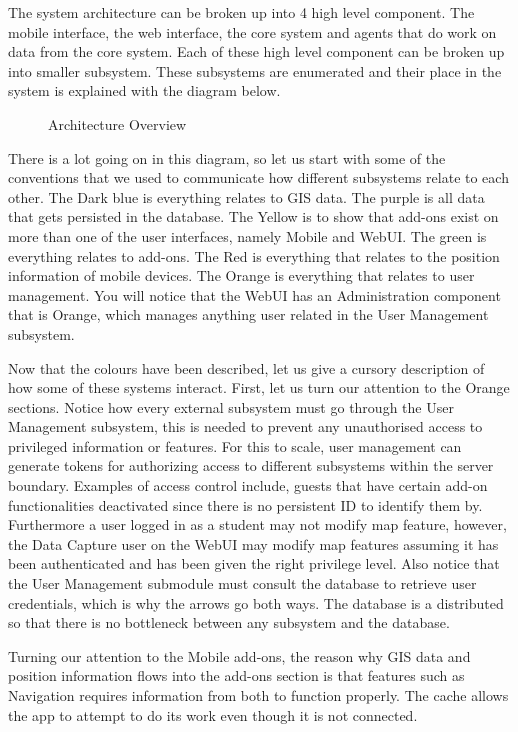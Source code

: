 The system architecture can be broken up into 4 high level component. The mobile interface, the web interface, the core system and agents that do work on data from the core system. Each of these high level component can be broken up into smaller subsystem. These subsystems are enumerated and their place in the system is explained with the diagram below.

\begin{figure}[h]
\caption{Architecture Overview}
\end{figure}
There is a lot going on in this diagram, so let us start with some of the conventions that we used to communicate how different subsystems relate to each other. The Dark blue is everything relates to GIS data. The purple is all data that gets persisted in the database. The Yellow is to show that add-ons exist on more than one of the user interfaces, namely Mobile and WebUI. The green is everything relates to add-ons. The Red is everything that relates to the position information of mobile devices. The Orange is everything that relates to user management. You will notice that the WebUI has an Administration component that is Orange, which manages anything user related in the User Management subsystem.\par
\bigskip
\noindent
Now that the colours have been described, let us give a cursory description of how some of these systems interact. First, let us  turn our attention to the Orange sections. Notice how every external subsystem must go through the User Management subsystem, this is needed to prevent any unauthorised access to privileged information or features. For this to scale, user management can generate tokens for authorizing access to different subsystems within the server boundary. Examples of access control include, guests that have certain add-on functionalities deactivated since there is no persistent ID to identify them by. Furthermore a user logged in as a student may not modify map feature, however, the Data Capture user on the WebUI may modify map features assuming it has been authenticated and has been given the right privilege level. Also notice that the User Management submodule must consult the database to retrieve user credentials, which is why the arrows go both ways. The database is a distributed so that there is no bottleneck between any subsystem and the database.\par\noindent
Turning our attention to the Mobile add-ons, the reason why GIS data and position information flows into the add-ons section is that features such as Navigation requires information from both to function properly. The cache allows the app to attempt to do its work even though it is not connected.\par\noindent

